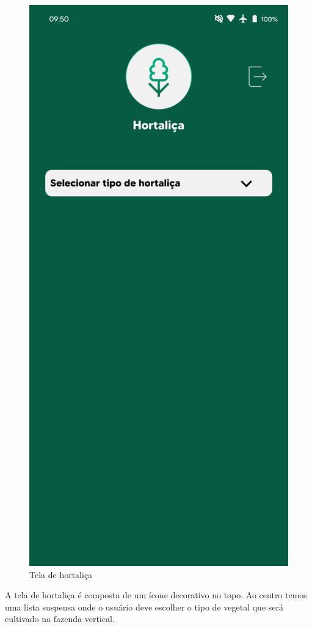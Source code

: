\begin{figure}[!h]
\centering
\caption{Tela de hortaliça}
\label{fig:picture8}
\includegraphics[scale=0.3]{Illustrations/Picture8.png}
\end{figure}
A tela de hortaliça é composta de um ícone decorativo no topo. Ao centro temos uma lista suspensa onde o usuário deve escolher o tipo de vegetal que será cultivado na fazenda vertical.

